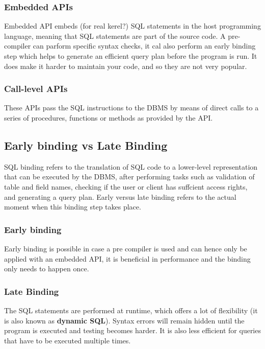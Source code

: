 \documentclass{report}
\begin{document}
				\subsubsection{Embedded APIs}
					Embedded API embeds (for real kerel?) SQL statements in the host programming language, meaning that SQL statements are part of the source code. A pre-compiler can parform specific syntax checks, it cal also perform an early binding step which helps to generate an efficient query plan before the program is run. It does make it harder to maintain your code, and so they are not very popular.
				\subsubsection{Call-level APIs}
					These APIs pass the SQL instructions to the DBMS by means of direct calls to a series of procedures, functions or methods as provided by the API.
			\subsection{Early binding vs Late Binding}
				SQL binding refers to the translation of SQL code to a lower-level representation that can be executed by the DBMS, after performing tasks such as validation of table and field names, checking if the user or client has suffcient access rights, and generating a query plan. Early versus late binding refers to the actual moment when this binding step takes place. 
				\subsubsection{Early binding}
					Early binding is possible in case a pre compiler is used and can hence only be applied with an embedded API, it is beneficial in performance and the binding only needs to happen once.
				\subsubsection{Late Binding}
					The SQL statements are performed at runtime, which offers a lot of flexibility (it is also known as \textbf{dynamic SQL}). Syntax errors will remain hidden until the program is executed and testing becomes harder. It is also less efficient for queries that have to be executed multiple times.
\end{document}
